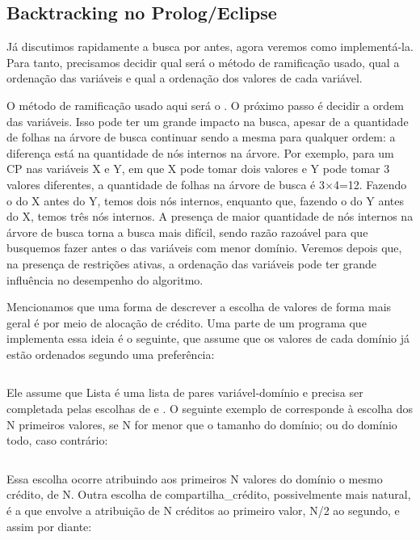 \documentclass{article}
\begin{document}
\subsection{Backtracking no Prolog/Eclipse}

Já discutimos rapidamente a busca por  antes, agora veremos como implementá-la. Para tanto, precisamos decidir qual será o método de ramificação usado, qual a ordenação das variáveis e qual a ordenação dos valores de cada variável.

O método de ramificação usado aqui será o . O próximo passo é decidir a ordem das variáveis. Isso pode ter um grande impacto na busca, apesar de a quantidade de folhas na árvore de busca continuar sendo a mesma para qualquer ordem: a diferença está na quantidade de nós internos na árvore. Por exemplo, para um CP nas variáveis X e Y, em que X pode tomar dois valores e Y pode tomar 3 valores diferentes, a quantidade de folhas na árvore de busca é 3$\times$4=12. Fazendo o
do X antes do Y, temos dois nós internos, enquanto que, fazendo o  do Y antes do X, temos três nós internos. A presença de maior quantidade de nós internos na árvore de busca torna a busca mais difícil, sendo razão razoável para que busquemos fazer antes o  das variáveis com menor domínio. Veremos depois que, na presença de restrições ativas, a ordenação das variáveis pode ter grande influência no desempenho do algoritmo.

Mencionamos que uma forma de descrever a escolha de valores de forma mais geral é por meio de alocação de crédito. Uma parte de um programa que implementa essa ideia é o seguinte, que assume que os valores de cada domínio já estão ordenados segundo uma preferência:

\inputminted{prolog}{../Exemplos/Cap8/prog2_busca2.pl}

Ele assume que Lista é uma lista de pares variável-domínio e precisa ser completada pelas escolhas
de  e . O seguinte exemplo de  corresponde à escolha dos N primeiros valores, se N for menor
que o tamanho do domínio; ou do domínio todo,
caso contrário:

\inputminted{prolog}{../Exemplos/Cap8/prog3_partilha.pl}

Essa escolha ocorre atribuindo aos primeiros N valores do domínio o mesmo crédito, de N. Outra escolha de compartilha\_crédito, possivelmente mais natural, é a que envolve a atribuição de N créditos ao primeiro valor, N/2 ao segundo, e assim por diante:
\end{document}
